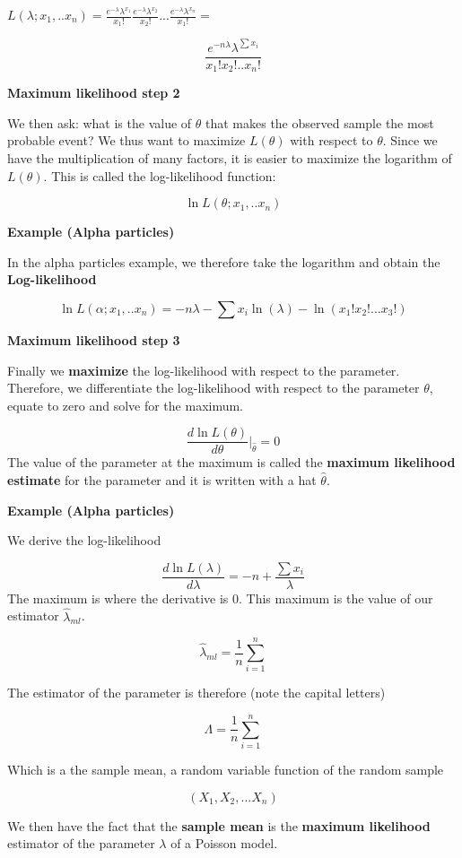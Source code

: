 \documentclass[
]{book}
\begin{document}
\(L(\lambda;x_1,..x_n)= \frac{e^{-\lambda}\lambda^{x_1}}{x_1!}\frac{e^{-\lambda}\lambda^{x_2}}{x_2!}...\frac{e^{-\lambda}\lambda^{x_n}}{x_1!}=\)

\[\frac{e^{-n\lambda}\lambda^{\sum {x_i}}}{x_1!x_2!..x_n!}\]

\textbf{Maximum likelihood step 2}

We then ask: what is the value of \(\theta\) that makes the observed sample the most probable event? We thus want to maximize \(L(\theta)\) with respect to \(\theta\). Since we have the multiplication of many factors, it is easier to maximize the logarithm of \(L(\theta)\). This is called the log-likelihood function:

\[\ln L(\theta;x_1,..x_n)\]

\textbf{Example (Alpha particles)}

In the alpha particles example, we therefore take the logarithm and obtain the \textbf{Log-likelihood}

\[\ln L(\alpha;x_1,..x_n)= -n\lambda - \sum{x_i}\ln(\lambda)-\ln(x_1!x_2!...x_3!)\]

\textbf{Maximum likelihood step 3}

Finally we \textbf{maximize} the log-likelihood with respect to the parameter. Therefore, we differentiate the log-likelihood with respect to the parameter \(\theta\), equate to zero and solve for the maximum.

\[\frac{d \ln L(\theta)}{d \theta} \big|_{\hat{\theta}}=0 \]
The value of the parameter at the maximum is called the \textbf{maximum likelihood estimate} for the parameter and it is written with a hat \(\hat{\theta}\).

\textbf{Example (Alpha particles)}

We derive the log-likelihood

\[\frac{d \ln L(\lambda)}{d \lambda}= -n + \frac{\sum{x_i}}{\lambda}\]
The maximum is where the derivative is \(0\). This maximum is the value of our estimator \(\hat{\lambda}_{ml}\).

\[\hat{\lambda}_{ml}=\frac{1}{n}\sum_{i=1}^{n}\]

The estimator of the parameter is therefore (note the capital letters)

\[\Lambda=\frac{1}{n}\sum_{i=1}^{n}\]

Which is a the sample mean, a random variable function of the random sample

\[(X_1, X_2, ... X_n)\]

We then have the fact that the \textbf{sample mean} is the \textbf{maximum likelihood} estimator of the parameter \(\lambda\) of a Poisson model.
\end{document}
